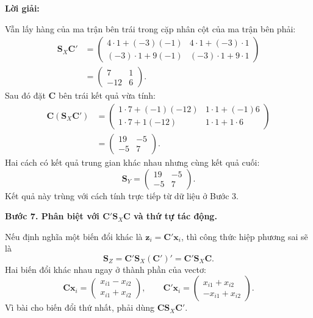 \documentclass[11pt,a4paper]{article}
\newenvironment{solution}{%
  \par\medskip\noindent\textbf{Lời giải:}\par\nobreak\smallskip\noindent\ignorespaces
}{\par}
\newcommand{\answer}[1]{\boxed{#1}}
\newcommand{\step}[2]{\par\medskip\noindent\textbf{Bước #1. #2}\par\nopagebreak[4]\smallskip\noindent}
\begin{document}
\begin{solution}
\begin{enumerate}[label=\textbf{\alph*)}]
Vẫn lấy hàng của ma trận bên trái trong cặp nhân cột của ma trận bên phải:
\begin{align*}
\mathbf{S}_X\mathbf{C}'
&=\begin{pmatrix}
4\cdot1+(-3)(-1)&4\cdot1+(-3)\cdot1\\
(-3)\cdot1+9(-1)&(-3)\cdot1+9\cdot1
\end{pmatrix}\\
&=\begin{pmatrix}7&1\\-12&6\end{pmatrix}.
\end{align*}
Sau đó đặt $\mathbf{C}$ bên trái kết quả vừa tính:
\begin{align*}
\mathbf{C}(\mathbf{S}_X\mathbf{C}')
&=\begin{pmatrix}
1\cdot7+(-1)(-12)&1\cdot1+(-1)6\\
1\cdot7+1(-12)&1\cdot1+1\cdot6
\end{pmatrix}\\
&=\begin{pmatrix}19&-5\\-5&7\end{pmatrix}.
\end{align*}
Hai cách có kết quả trung gian khác nhau nhưng cùng kết quả cuối:
\[
\answer{\mathbf{S}_Y=\begin{pmatrix}19&-5\\-5&7\end{pmatrix}}.
\]
Kết quả này trùng với cách tính trực tiếp từ dữ liệu ở Bước 3.

\step{7}{Phân biệt với $\mathbf{C}'\mathbf{S}_X\mathbf{C}$ và thứ tự tác động.}
Nếu định nghĩa một biến đổi khác là $\mathbf{z}_i=\mathbf{C}'\mathbf{x}_i$,
thì công thức hiệp phương sai sẽ là
\[
\mathbf{S}_Z=\mathbf{C}'\mathbf{S}_X(\mathbf{C}')'
=\mathbf{C}'\mathbf{S}_X\mathbf{C}.
\]
Hai biến đổi khác nhau ngay ở thành phần của vectơ:
\[
\mathbf{C}\mathbf{x}_i
=\begin{pmatrix}x_{i1}-x_{i2}\\x_{i1}+x_{i2}\end{pmatrix},\qquad
\mathbf{C}'\mathbf{x}_i
=\begin{pmatrix}x_{i1}+x_{i2}\\-x_{i1}+x_{i2}\end{pmatrix}.
\]
Vì bài cho biến đổi thứ nhất, phải dùng $\mathbf{C}\mathbf{S}_X\mathbf{C}'$.


\end{enumerate}
\end{solution}
\end{document}
